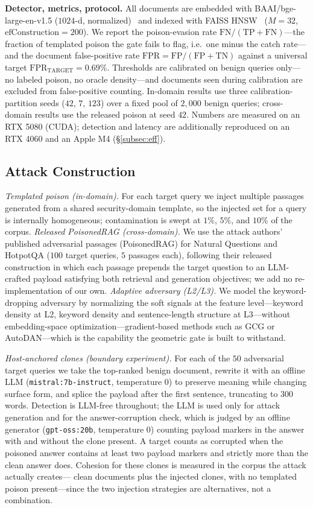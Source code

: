 \documentclass[10pt,journal,compsoc]{IEEEtran}
\begin{document}
\noindent\textbf{Detector, metrics, protocol.} All documents are embedded with
BAAI/bge-large-en-v1.5 ($1024$-d, normalized)~\cite{bge} and indexed with FAISS
HNSW~\cite{faiss,hnsw} ($M=32$, $\mathrm{efConstruction}=200$). We report the
poison-evasion rate $\mathrm{FN}/(\mathrm{TP}+\mathrm{FN})$---the fraction of
templated poison the gate fails to flag, i.e.\ one minus the catch rate---and the
document false-positive rate $\mathrm{FPR}=\mathrm{FP}/(\mathrm{FP}+\mathrm{TN})$
against a universal target $\mathrm{FPR}_{\mathrm{TARGET}}=0.69\%$. Thresholds are
calibrated on benign queries only---no labeled poison, no oracle density---and
documents seen during calibration are excluded from false-positive counting.
In-domain results use three calibration-partition seeds ($42$, $7$, $123$) over a
fixed pool of $2{,}000$ benign queries; cross-domain results use the released
poison at seed $42$. Numbers are measured on an RTX 5080 (CUDA); detection and
latency are additionally reproduced on an RTX 4060 and an Apple M4
(\S\ref{subsec:eff}).

\subsection{Attack Construction}
\label{app:attack}
\emph{Templated poison (in-domain).} For each target query we inject multiple
passages generated from a shared security-domain template, so the injected set for
a query is internally homogeneous; contamination is swept at $1\%$, $5\%$, and
$10\%$ of the corpus. \emph{Released PoisonedRAG (cross-domain).} We use the attack
authors' published adversarial passages (PoisonedRAG) for Natural Questions
and HotpotQA ($100$ target queries, $5$ passages each), following their released
construction in which each passage prepends the target question to an LLM-crafted
payload satisfying both retrieval and generation objectives; we add no
re-implementation of our own. \emph{Adaptive adversary (L2/L3).} We model the
keyword-dropping adversary by normalizing the soft signals at the feature
level---keyword density at L2, keyword density and sentence-length structure at
L3---without embedding-space optimization---gradient-based methods such as
GCG or AutoDAN---which is the capability the geometric
gate is built to withstand.

\emph{Host-anchored clones (boundary experiment).} For each of the $50$ adversarial target
queries we take the top-ranked benign document, rewrite it with an offline LLM
(\texttt{mistral:7b-instruct}, temperature $0$) to preserve meaning while changing surface form,
and splice the payload after the first sentence, truncating to $300$ words. Detection is
LLM-free throughout; the LLM is used only for attack generation and for the answer-corruption
check, which is judged by an offline generator (\texttt{gpt-oss:20b}, temperature $0$) counting
payload markers in the answer with and without the clone present. A target counts as corrupted
when the poisoned answer contains at least two payload markers and strictly more than the clean
answer does. Cohesion for these clones is measured in the corpus the attack actually creates---
clean documents plus the injected clones, with no templated poison present---since the two
injection strategies are alternatives, not a combination.
\end{document}
